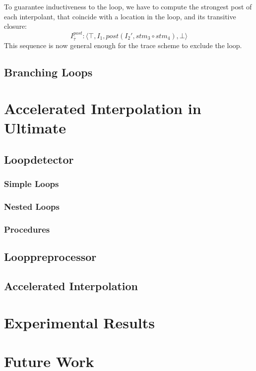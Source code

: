 \documentclass{article}
\newcommand\mycom[1]{}
\newcommand\mycom[1]{#1}
\newcommand{\jw}[1]{\mycom{\todo[color=blue!40,inline]{\small JW: #1}}}
\begin{document}
To guarantee inductiveness to the loop, we have to compute the strongest post of each interpolant, that coincide with a location in the loop, and its transitive closure:
\begin{equation*}
I_{\bar{\tau}}^{post}: \langle \top, I_1, post(I_2', stm_3 \circ stm_4), \bot  \rangle
\end{equation*}
This sequence is now general enough for the trace scheme to exclude the loop.

\subsection{Branching Loops}

\section{Accelerated Interpolation in Ultimate}
\subsection{Loopdetector}
\subsubsection{Simple Loops}

\subsubsection{Nested Loops}

\subsubsection{Procedures}

\subsection{Looppreprocessor}

\subsection{Accelerated Interpolation}


\section{Experimental Results}

\section{Future Work}
\jw{More Acceleration methods}

\pagebreak
{}



	
\end{document}
